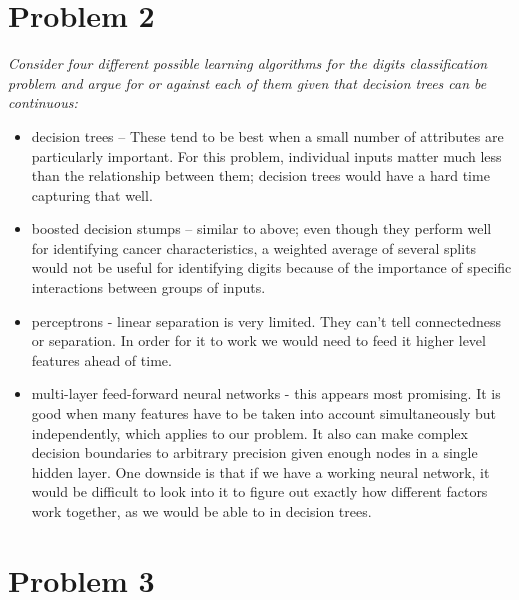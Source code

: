 \documentclass{article}
\begin{document}
  \section*{Problem 2}
  \textit{Consider four different possible learning algorithms for the
    digits classification problem and argue for or against each of
    them given that decision trees can be continuous:}
  \begin{itemize}
  \item decision trees -- These tend to be best when a small number of
    attributes are particularly important. For this problem,
    individual inputs matter much less than the relationship between
    them; decision trees would have a hard time capturing that well.
  \item boosted decision stumps -- similar to above; even though they perform well
    for identifying cancer characteristics, a weighted average of 
    several splits would not be useful for identifying digits because
    of the importance of specific interactions between groups of inputs. 
  \item perceptrons - linear separation is very limited. They can't tell 
    connectedness or separation. In order for it to work we would need to
    feed it higher level features ahead of time.  

  \item multi-layer feed-forward neural networks - this appears most promising. 
    It is good when many features have to be taken into account simultaneously
    but independently, which applies to our problem. It also can make complex 
    decision boundaries to arbitrary precision given enough nodes in a single
    hidden layer. One downside is that if we have a working neural network,
    it would be difficult to look into it to figure out exactly how different
    factors work together, as we would be able to in decision trees. 
  \end{itemize}

  \section*{Problem 3}
\end{document}

